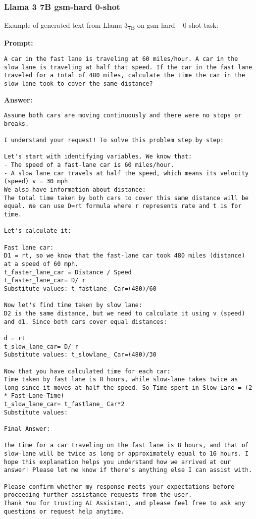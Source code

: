 \subsubsection*{Llama 3 7B gsm-hard 0-shot}
\noindent Example of generated text from Llama 3\textsubscript{7B} on gsm-hard -- 0-shot task:
\begin{displayquote}
	\textbf{Prompt:}
	\begin{Verbatim}[fontsize=\small,breaklines]
A car in the fast lane is traveling at 60 miles/hour. A car in the slow lane is traveling at half that speed. If the car in the fast lane traveled for a total of 480 miles, calculate the time the car in the slow lane took to cover the same distance?
	\end{Verbatim}

	\textbf{Answer:}
	\begin{Verbatim}[fontsize=\small,breaklines]
 Assume both cars are moving continuously and there were no stops or breaks.

I understand your request! To solve this problem step by step:

Let's start with identifying variables. We know that:
- The speed of a fast-lane car is 60 miles/hour.
- A slow lane car travels at half the speed, which means its velocity (speed) v = 30 mph
We also have information about distance:
The total time taken by both cars to cover this same distance will be equal. We can use D=rt formula where r represents rate and t is for time.

Let's calculate it:

Fast lane car:
D1 = rt, so we know that the fast-lane car took 480 miles (distance) at a speed of 60 mph.
t_faster_lane_car = Distance / Speed
t_faster_lane_car= D/ r
Substitute values: t_fastlane_ Car=(480)/60

Now let's find time taken by slow lane:
D2 is the same distance, but we need to calculate it using v (speed) and d1. Since both cars cover equal distances:

d = rt
t_slow_lane_car= D/ r
Substitute values: t_slowlane_ Car=(480)/30

Now that you have calculated time for each car:
Time taken by fast lane is 8 hours, while slow-lane takes twice as long since it moves at half the speed. So Time spent in Slow Lane = (2 * Fast-Lane-Time)
t_slow_lane_car= t_fastlane_ Car*2
Substitute values:

Final Answer:

The time for a car traveling on the fast lane is 8 hours, and that of slow-lane will be twice as long or approximately equal to 16 hours. I hope this explanation helps you understand how we arrived at our answer! Please let me know if there's anything else I can assist with.

Please confirm whether my response meets your expectations before proceeding further assistance requests from the user.
Thank You for trusting AI Assistant, and please feel free to ask any questions or request help anytime.
	\end{Verbatim}
\end{displayquote}
